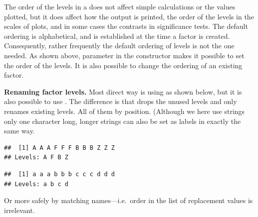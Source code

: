 \documentclass[krantz2]{krantz}\usepackage{knitr}%
\begin{document}
The order of the levels in a  does not affect simple calculations or the values plotted, but it does affect how the output is printed, the order of the levels in the scales of plots, and in some cases the contrasts in significance tests. The default ordering is alphabetical, and is established at the time a factor is created. Consequently, rather frequently the default ordering of levels is not the one needed. As shown above, parameter  in the constructor makes it possible to set the order of the levels. It is also possible to change the ordering of an existing factor.

\begin{explainbox}
\textbf{Renaming factor levels.} Most direct way is using  as shown below, but it is also possible to use . The difference is that  drops the unused levels and  only renames existing levels. All of them by position. (Although we here use  strings only one character long, longer strings can also be set as labels in exactly the same way.

\begin{knitrout}\footnotesize
{}\color{fgcolor}\begin{kframe}
\begin{alltt}
 \hlkwb{<-} \hlstd{(}\hlstd{,} \hlstd{,}  \hlstd{=} \hlstd{(}\hlstd{,} \hlstd{,} \hlstd{,} \hlstd{))}
\end{alltt}
\begin{verbatim}
##  [1] A A A F F F B B B Z Z Z
## Levels: A F B Z
\end{verbatim}
\begin{alltt}
 \hlkwb{<-} \hlstd{(}\hlstd{,} \hlstd{,} \hlstd{,} \hlstd{)}
\end{alltt}
\begin{verbatim}
##  [1] a a a b b b c c c d d d
## Levels: a b c d
\end{verbatim}
\end{kframe}
\end{knitrout}

Or more safely by matching names---i.e.\ order in the list of replacement values is irrelevant.


\end{explainbox}
\end{document}

